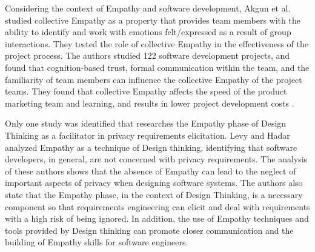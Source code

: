 \documentclass[conference]{IEEEtran}
\begin{document}
Considering the context of Empathy and software development, Akgun et al. \cite{DBLP:journals/iam/AkgunKCD15} studied collective Empathy as a property that provides team members with the ability to identify and work with emotions felt/expressed as a result of group interactions. They tested the role of collective Empathy in the effectiveness of the project process. The authors studied 122 software development projects, and found that cognition-based trust, formal communication within the team, and the familiarity of team members can influence the collective Empathy of the project teams. They found that collective Empathy affects the speed of the product marketing team and learning, and results in lower project development costs \cite{DBLP:journals/iam/AkgunKCD15}.


Only one study was identified that researches the Empathy phase of Design Thinking as a facilitator in privacy requirements elicitation. Levy and Hadar \cite{DBLP:conf/re/LevyH18} analyzed Empathy as a technique of Design thinking, identifying that software developers, in general, are not concerned with privacy requirements. The analysis of these authors shows that the absence of Empathy can lead to the neglect of important aspects of privacy when designing software systems. The authors also state that the Empathy phase, in the context of Design Thinking, is a necessary component so that requirements engineering can elicit and deal with requirements with a high risk of being ignored. In addition, the use of Empathy techniques and tools provided by Design thinking can promote closer communication and the building of Empathy skills for software engineers.
\end{document}

